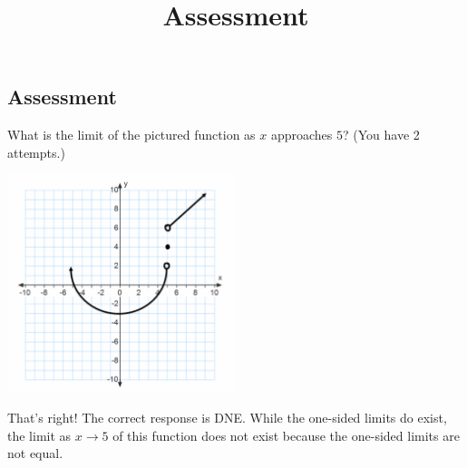 \documentclass{ximera}
\title{Assessment}
\begin{document}
\begin{abstract}
\end{abstract}

\maketitle

\subsection{Assessment}
\begin{question}
What is the limit of the pictured function as $x$ approaches $5$? (You have 2 attempts.)

\includegraphics[width=0.5\textwidth]{graph3.png}
\begin{multipleChoice}  
\end{multipleChoice}  

\begin{explanation}
    That's right! The correct response is DNE. While the one-sided limits do exist, the limit as $x \to 5$ of this function does not exist because the one-sided limits are not equal.
\end{explanation}
\end{question}
\end{document}
